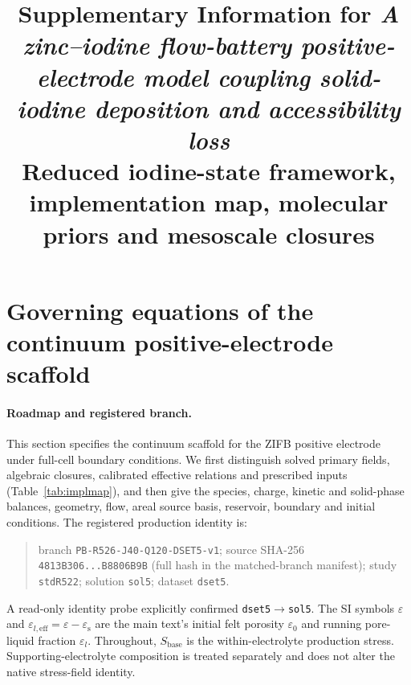 \documentclass[11pt]{article}
\title{\bfseries Supplementary Information for \textit{A zinc--iodine flow-battery positive-electrode model
coupling solid-iodine deposition and accessibility loss}\\[3pt]
\normalsize\mdseries Reduced iodine-state framework, implementation map, molecular priors and mesoscale closures}
\author{}
\date{}
\newcommand{\epss}{\varepsilon_{\mathrm{s}}}
\begin{document}
\maketitle
\tableofcontents
\bigskip

\section{Governing equations of the continuum positive-electrode scaffold}

\paragraph{Roadmap and registered branch.} This section specifies the continuum scaffold for the ZIFB
positive electrode under full-cell boundary conditions. We first distinguish solved primary fields,
algebraic closures, calibrated effective relations and prescribed inputs (Table~\ref{tab:implmap}), and then
give the species, charge, kinetic and solid-phase balances, geometry, flow, areal source basis, reservoir,
boundary and initial conditions. The registered production identity is:
\begin{quote}\small
branch \texttt{PB-R526-J40-Q120-DSET5-v1}; source SHA-256
\texttt{4813B306...B8806B9B} (full hash in the matched-branch manifest); study \texttt{stdR522};
solution \texttt{sol5}; dataset \texttt{dset5}.
\end{quote}
A read-only identity probe explicitly
confirmed \texttt{dset5}$\rightarrow$\texttt{sol5}. The SI symbols $\varepsilon$ and
$\varepsilon_{l,\mathrm{eff}}=\varepsilon-\epss$ are the main text's initial felt porosity
$\varepsilon_0$ and running pore-liquid fraction $\varepsilon_l$. Throughout, $S_{\mathrm{base}}$ is the
within-electrolyte production stress. Supporting-electrolyte composition is treated separately and does not
alter the native stress-field identity.
\end{document}
